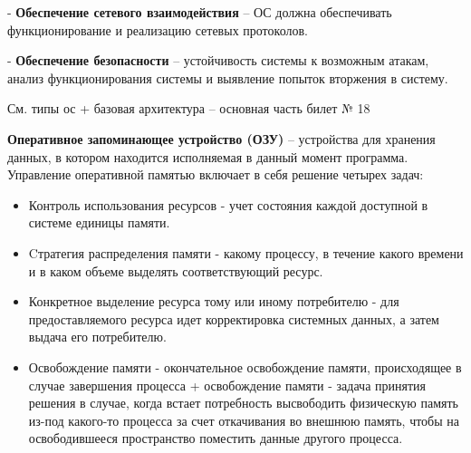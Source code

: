 - \textbf{Обеспечение сетевого взаимодействия} -- ОС должна обеспечивать функционирование и реализацию сетевых протоколов.

- \textbf{Обеспечение безопасности} -- устойчивость системы к возможным атакам, анализ функционирования системы и выявление попыток вторжения в систему.


См. типы ос + базовая архитектура -- основная часть билет № 18

\textbf{Оперативное запоминающее устройство (ОЗУ)} -- устройства для хранения данных, в котором находится исполняемая в данный момент программа. Управление оперативной памятью включает в себя решение четырех задач:
\begin{itemize}
    \item Контроль использования ресурсов - учет состояния каждой доступной в системе единицы памяти.
    \item Cтратегия распределения памяти - какому процессу, в течение какого времени и в каком объеме выделять соответствующий ресурс.
    \item Конкретное выделение ресурса тому или иному потребителю - для предоставляемого ресурса идет корректировка системных данных, а затем выдача его потребителю.
    \item Освобождение памяти - окончательное освобождение памяти, происходящее в случае завершения процесса + освобождение памяти - задача принятия решения в случае, когда встает потребность высвободить физическую память из-под какого-то процесса за счет откачивания во внешнюю память, чтобы на освободившееся пространство поместить данные другого процесса.
\end{itemize}

